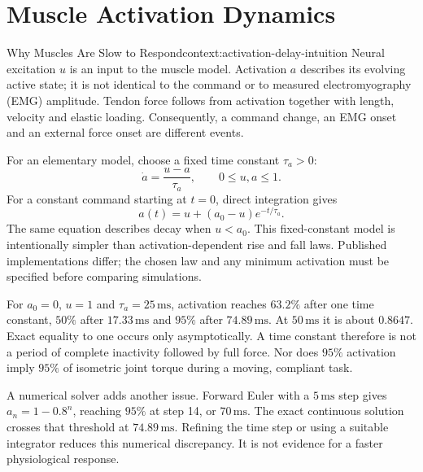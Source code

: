 \section{Muscle Activation Dynamics}

\begin{laymansbox}{Why Muscles Are Slow to Respond}{context:activation-delay-intuition}
Neural excitation $u$ is an input to the muscle model. Activation $a$ describes its evolving active state; it is not identical to the command or to measured electromyography (EMG) amplitude. Tendon force follows from activation together with length, velocity and elastic loading. Consequently, a command change, an EMG onset and an external force onset are different events.
\end{laymansbox}

For an elementary model, choose a fixed time constant $\tau_a>0$:
\begin{equation}
\dot a=\frac{u-a}{\tau_a},\qquad 0\leq u,a\leq1.
\label{eq:activation-rise}
\end{equation}
For a constant command starting at $t=0$, direct integration gives
\begin{equation}
a(t)=u+(a_0-u)e^{-t/\tau_a}.
\label{eq:activation-fall}
\end{equation}
The same equation describes decay when $u<a_0$. This fixed-constant model is intentionally simpler than activation-dependent rise and fall laws. Published implementations differ; the chosen law and any minimum activation must be specified before comparing simulations. \citep{OpenSimActivationDynamics}

For $a_0=0$, $u=1$ and $\tau_a=25\,\mathrm{ms}$, activation reaches $63.2\%$ after one time constant, $50\%$ after $17.33\,\mathrm{ms}$ and $95\%$ after $74.89\,\mathrm{ms}$. At $50\,\mathrm{ms}$ it is about $0.8647$. Exact equality to one occurs only asymptotically. A time constant therefore is not a period of complete inactivity followed by full force. Nor does $95\%$ activation imply $95\%$ of isometric joint torque during a moving, compliant task.

A numerical solver adds another issue. Forward Euler with a $5\,\mathrm{ms}$ step gives $a_n=1-0.8^n$, reaching $95\%$ at step 14, or $70\,\mathrm{ms}$. The exact continuous solution crosses that threshold at $74.89\,\mathrm{ms}$. Refining the time step or using a suitable integrator reduces this numerical discrepancy. It is not evidence for a faster physiological response.


